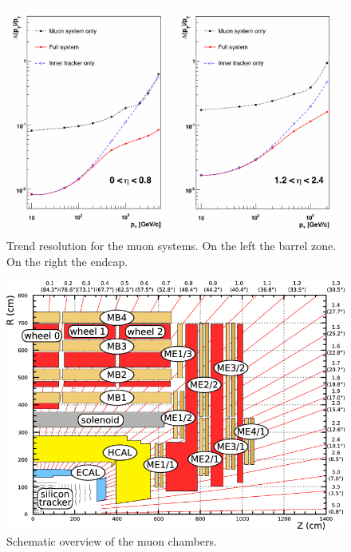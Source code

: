 \begin{figure}
\centering
\includegraphics[scale= 1.2]{../Cap2/muon_res}
\caption{Trend resolution for the muon systems. On the left the barrel zone. On the right the endcap.}
\label{muon_res}
\end{figure}
\begin{figure}
\centering
\includegraphics[scale= 0.4]{../Cap2/muon}
\caption{Schematic overview of the muon chambers.}
\label{muon_c}
\end{figure}


